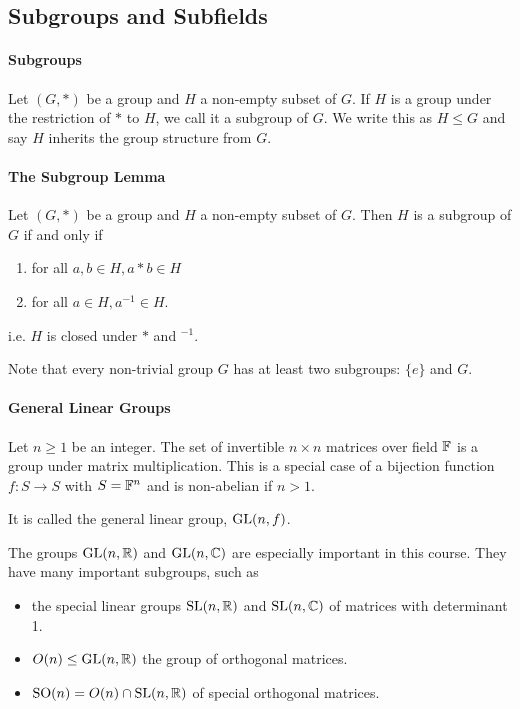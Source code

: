 \subsection{Subgroups and Subfields}
\paragraph{Subgroups}
Let \((G,*)\) be a group and \(H\) a non-empty subset of \(G\). If \(H\) is a group under the restriction of \(*\) to \(H\), we call it a subgroup of \(G\). We write this as \(H \leq G\) and say \(H\) inherits the group structure from \(G\).

\paragraph{The Subgroup Lemma}
Let \((G,*)\) be a group and \(H\) a non-empty subset of \(G\). Then \(H\) is a subgroup of \(G\) if and only if
\begin{enumerate}
    \item for all \(a,b \in H, a * b \in H\)
    \item for all \(a \in H, a^{-1} \in H\).
\end{enumerate}
i.e. \(H\) is closed under \(*\) and \(^{-1}\).

Note that every non-trivial group \(G\) has at least two subgroups: \(\{e\}\) and \(G\).

\paragraph{General Linear Groups}
Let \(n \geq 1\) be an integer. The set of invertible \(n \times n\) matrices over field \(\mathbb{F}\) is a group under matrix multiplication. This is a special case of a bijection function \(f: S \to S\) with \(S = \mathbb{F}^n\) and is non-abelian if \(n > 1\).

It is called the general linear group, \(\operatorname{GL}(n,f)\).

The groups \(\operatorname{GL}(n,\mathbb{R})\) and \(\operatorname{GL}(n,\mathbb{C})\) are especially important in this course.
They have many important subgroups, such as
\begin{itemize}
    \item the special linear groups \(\operatorname{SL}(n,\mathbb{R})\) and \(\operatorname{SL}(n,\mathbb{C})\) of matrices with determinant 1.
    \item \(O(n) \leq \operatorname{GL}(n,\mathbb{R})\) the group of orthogonal matrices.
    \item \(\operatorname{SO}(n) = O(n) \cap \operatorname{SL}(n,\mathbb{R})\) of special orthogonal matrices.
\end{itemize}

